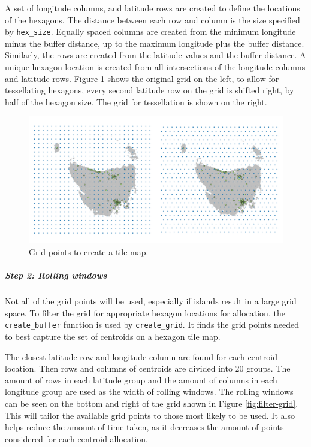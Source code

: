 \documentclass{monashthesis}
\begin{document}
A set of longitude columns, and latitude rows are created to define the locations of the hexagons. The distance between each row and column is the size specified by \texttt{hex\_size}.
Equally spaced columns are created from the minimum longitude minus the buffer distance, up to the maximum longitude plus the buffer distance. Similarly, the rows are created from the latitude values and the buffer distance.
A unique hexagon location is created from all intersections of the longitude columns and latitude rows.
Figure \ref{fig:grid2} shows the original grid on the left, to allow for tessellating hexagons, every second latitude row on the grid is shifted right, by half of the hexagon size. The grid for tessellation is shown on the right.

\begin{figure}[H]
\centering
\includegraphics[width=14cm]{figures/03-algorithm/2grid.png}
\caption{\label{fig:grid2}Grid points to create a tile map.}
\end{figure}

\hypertarget{step-2-rolling-windows}{%
\subparagraph{Step 2: Rolling windows}\label{step-2-rolling-windows}}

Not all of the grid points will be used, especially if islands result in a large grid space.
To filter the grid for appropriate hexagon locations for allocation, the \texttt{create\_buffer} function is used by \texttt{create\_grid}.
It finds the grid points needed to best capture the set of centroids on a hexagon tile map.

The closest latitude row and longitude column are found for each centroid location. Then rows and columns of centroids are divided into 20 groups.
The amount of rows in each latitude group and the amount of columns in each longitude group are used as the width of rolling windows. The rolling windows can be seen on the bottom and right of the grid shown in Figure \ref{fig:filter-grid}.
This will tailor the available grid points to those most likely to be used.
It also helps reduce the amount of time taken, as it decreases the amount of points considered for each centroid allocation.
\end{document}

